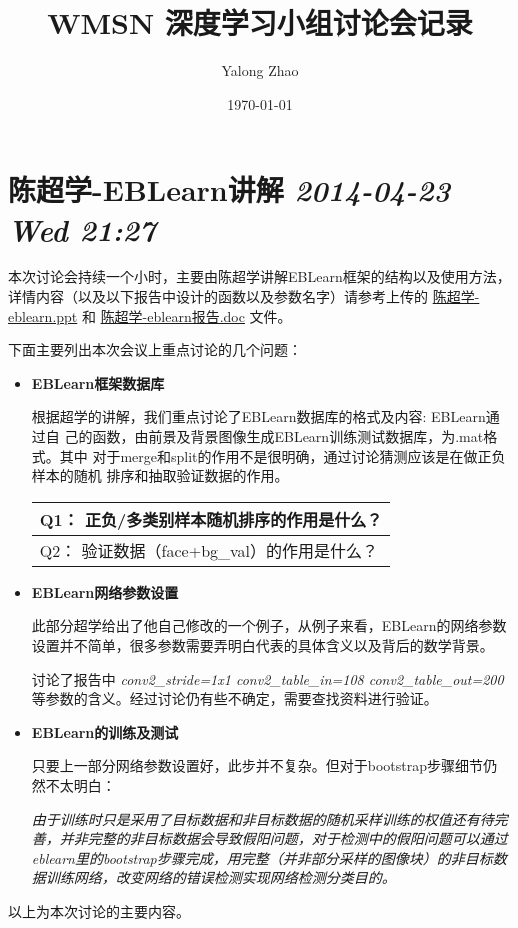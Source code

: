 \documentclass[work,subfig,biblatex]{article}
\title{WMSN 深度学习小组讨论会记录}
\author{Yalong Zhao}
\date{\today}
\begin{document}
\maketitle

\setcounter{tocdepth}{3}
\tableofcontents
\vspace*{1cm}

\section{陈超学-EBLearn讲解 \textit{2014-04-23 Wed 21:27}}
\label{sec-1}

本次讨论会持续一个小时，主要由陈超学讲解EBLearn框架的结构以及使用方法，
详情内容（以及以下报告中设计的函数以及参数名字）请参考上传的 \href{file://.陈超学-eblearn.ppt}{陈超学-eblearn.ppt} 和 \href{file://.陈超学-eblearn报告.doc}{陈超学-eblearn报告.doc} 文件。

下面主要列出本次会议上重点讨论的几个问题：
\begin{itemize}
\item \textbf{EBLearn框架数据库}

  根据超学的讲解，我们重点讨论了EBLearn数据库的格式及内容: EBLearn通过自
  己的函数，由前景及背景图像生成EBLearn训练测试数据库，为.mat格式。其中
  对于merge和split的作用不是很明确，通过讨论猜测应该是在做正负样本的随机
  排序和抽取验证数据的作用。


\begin{center}
\begin{tabular}{l}
 Q1： 正负/多类别样本随机排序的作用是什么？   \\
\hline
 Q2： 验证数据（face+bg\_val）的作用是什么？  \\
\end{tabular}
\end{center}


\end{itemize}


\begin{itemize}
\item \textbf{EBLearn网络参数设置}
  
  此部分超学给出了他自己修改的一个例子，从例子来看，EBLearn的网络参数
  设置并不简单，很多参数需要弄明白代表的具体含义以及背后的数学背景。
  
  讨论了报告中
  \emph{conv2\_stride=1x1 conv2\_table\_in=108 conv2\_table\_out=200}
  等参数的含义。经过讨论仍有些不确定，需要查找资料进行验证。
\item \textbf{EBLearn的训练及测试}
  
  只要上一部分网络参数设置好，此步并不复杂。但对于bootstrap步骤细节仍
  然不太明白：

  \emph{由于训练时只是采用了目标数据和非目标数据的随机采样训练的权值还有待完善，并非完整的非目标数据会导致假阳问题，对于检测中的假阳问题可以通过eblearn里的bootstrap步骤完成，用完整（并非部分采样的图像块）的非目标数据训练网络，改变网络的错误检测实现网络检测分类目的。}
\end{itemize}
以上为本次讨论的主要内容。
\end{document}
